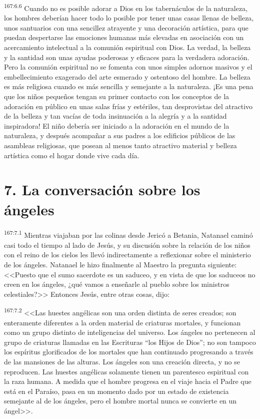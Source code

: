 \par 
\textsuperscript{167:6.6} Cuando no es posible adorar a Dios en los tabernáculos de la naturaleza, los hombres deberían hacer todo lo posible por tener unas casas llenas de belleza, unos santuarios con una sencillez atrayente y una decoración artística, para que puedan despertarse las emociones humanas más elevadas en asociación con un acercamiento intelectual a la comunión espiritual con Dios. La verdad, la belleza y la santidad son unas ayudas poderosas y eficaces para la verdadera adoración. Pero la comunión espiritual no se fomenta con unos simples adornos masivos y el embellecimiento exagerado del arte esmerado y ostentoso del hombre. La belleza es más religiosa cuando es más sencilla y semejante a la naturaleza. ¡Es una pena que los niños pequeños tengan su primer contacto con los conceptos de la adoración en público en unas salas frías y estériles, tan desprovistas del atractivo de la belleza y tan vacías de toda insinuación a la alegría y a la santidad inspiradora! El niño debería ser iniciado a la adoración en el mundo de la naturaleza, y después acompañar a sus padres a los edificios públicos de las asambleas religiosas, que posean al menos tanto atractivo material y belleza artística como el hogar donde vive cada día.

\section*{7. La conversación sobre los ángeles}
\par 
\textsuperscript{167:7.1} Mientras viajaban por las colinas desde Jericó a Betania, Natanael caminó casi todo el tiempo al lado de Jesús, y su discusión sobre la relación de los niños con el reino de los cielos les llevó indirectamente a reflexionar sobre el ministerio de los ángeles. Natanael le hizo finalmente al Maestro la pregunta siguiente: <<Puesto que el sumo sacerdote es un saduceo, y en vista de que los saduceos no creen en los ángeles, ¿qué vamos a enseñarle al pueblo sobre los ministros celestiales?>> Entonces Jesús, entre otras cosas, dijo:

\par 
\textsuperscript{167:7.2} <<Las huestes angélicas son una orden distinta de seres creados; son enteramente diferentes a la orden material de criaturas mortales, y funcionan como un grupo distinto de inteligencias del universo. Los ángeles no pertenecen al grupo de criaturas llamadas en las Escrituras ``los Hijos de Dios''; no son tampoco los espíritus glorificados de los mortales que han continuado progresando a través de las mansiones de las alturas. Los ángeles son una creación directa, y no se reproducen. Las huestes angélicas solamente tienen un parentesco espiritual con la raza humana. A medida que el hombre progresa en el viaje hacia el Padre que está en el Paraíso, pasa en un momento dado por un estado de existencia semejante al de los ángeles, pero el hombre mortal nunca se convierte en un ángel>>.

